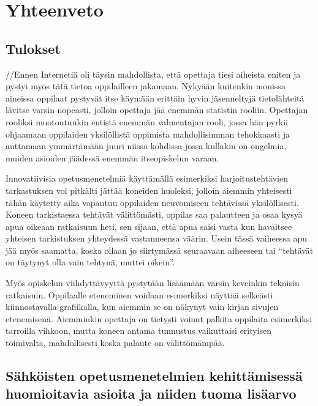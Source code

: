 \documentclass[utf8,bachelor]{gradu3}
\begin{document}
\chapter{Yhteenveto}

\section{Tulokset}
//Ennen Internetiä oli täysin mahdollista, että opettaja tiesi aiheista eniten ja pystyi myös tätä tietoa oppilailleen jakamaan. Nykyään kuitenkin monissa aineissa oppilaat pystyvät itse käymään erittäin hyvin jäsenneltyjä tietolähteitä lävitse varsin nopeasti, jolloin opettaja jää enemmän statistin rooliin. Opettajan rooliksi muotoutuukin entistä enemmän valmentajan rooli, jossa hän pyrkii ohjaamaan oppilaiden yksilöllistä oppimista mahdollisimman tehokkaasti ja auttamaan ymmärtämään juuri niissä kohdissa jossa kullakin on ongelmia, muiden asioiden jäädessä enemmän itseopiskelun varaan.

Innovatiivisia opetusmenetelmiä käyttämällä esimerkiksi harjoitustehtävien tarkastuksen voi pitkälti jättää koneiden huoleksi, jolloin aiemmin yhteisesti tähän käytetty aika vapautuu oppilaiden neuvomiseen tehtävissä yksilöllisesti. Koneen tarkistaessa tehtävät välittömästi, oppilas saa palautteen ja osaa kysyä apua oikeaan ratkaisuun heti, sen sijaan, että apua saisi vasta kun havaitsee yhteisen tarkistuksen yhteydessä vastanneensa väärin. Usein tässä vaiheessa apu jää myös saamatta, koska ollaan jo siirtymässä seuraavaan aiheeseen tai “tehtävät on täytynyt olla vain tehtynä, muttei oikein”.

Myös opiskelun viihdyttävyyttä pystytään lisäämään varsin keveinkin teknisin ratkaisuin. Oppilaalle eteneminen voidaan esimerkiksi näyttää selkeästi kiinnostavalla grafiikalla, kun aiemmin se on näkynyt vain kirjan sivujen etenemisenä. Aiemminkin opettaja on tietysti voinut palkita oppilaita esimerkiksi tarroilla vihkoon, mutta koneen antama tunnustus vaikuttaisi erityisen toimivalta, mahdollisesti koska palaute on välittömämpää.

\section{Sähköisten opetusmenetelmien kehittämisessä huomioitavia asioita ja niiden tuoma lisäarvo}
\end{document}
